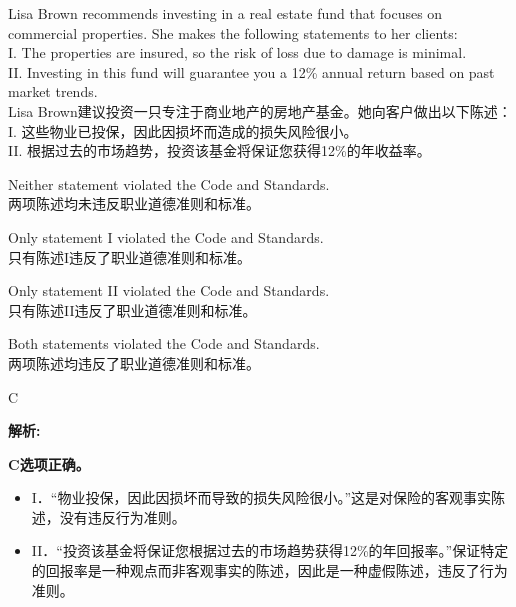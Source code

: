 \documentclass{article}
\newcounter{question} %
\newenvironment{explanation}
{\textbf{解析:}\par}
{\par}
\begin{document}
\begin{question}
     Lisa Brown recommends investing in a real estate fund that focuses on commercial properties. She makes the following statements to her clients: \\
     I. The properties are insured, so the risk of loss due to damage is minimal.\\
    II. Investing in this fund will guarantee you a 12\% annual return based on past market trends.\\
    Lisa Brown建议投资一只专注于商业地产的房地产基金。她向客户做出以下陈述： \\
    I. 这些物业已投保，因此因损坏而造成的损失风险很小。\\
   II. 根据过去的市场趋势，投资该基金将保证您获得12\%的年收益率。\\

\end{question}

\begin{choices}
    \item Neither statement violated the Code and Standards.\\
   两项陈述均未违反职业道德准则和标准。
    \item Only statement I violated the Code and Standards.\\
    只有陈述I违反了职业道德准则和标准。
    \item Only statement II violated the Code and Standards.\\
    只有陈述II违反了职业道德准则和标准。
    \item Both statements violated the Code and Standards.\\
    两项陈述均违反了职业道德准则和标准。
\end{choices}

\begin{correctanswer}
C
\end{correctanswer}

\begin{explanation}
    \textbf{C选项正确。}
    \begin{itemize}
    \item I．“物业投保，因此因损坏而导致的损失风险很小。”这是对保险的客观事实陈述，没有违反行为准则。
    \item II．“投资该基金将保证您根据过去的市场趋势获得12\%的年回报率。”保证特定的回报率是一种观点而非客观事实的陈述，因此是一种虚假陈述，违反了行为准则。
    \end{itemize}
\end{explanation}
\end{document}
